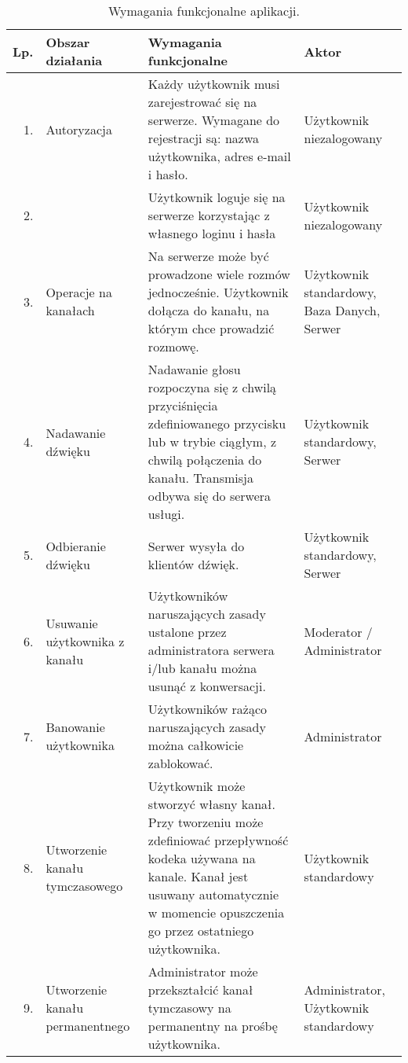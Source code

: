 \begin{longtabu} to 
	\caption{Wymagania funkcjonalne aplikacji.}
	\label{tab:wymfun} \\
	
	\hline
	\rowfont\bfseries Lp. & Obszar działania & Wymagania funkcjonalne & Aktor \\ \hline
	\endhead
	\endfoot
	\endlastfoot

	1.&
	Autoryzacja &
	Każdy użytkownik musi zarejestrować się na serwerze. Wymagane do
	rejestracji są: nazwa użytkownika, adres e-mail i hasło. &
	Użytkownik niezalogowany \\  
	
	2.&
	&
	Użytkownik loguje się na serwerze korzystając z własnego loginu i hasła &
	Użytkownik niezalogowany\\ \hline
	
	3.&
	Operacje na kanałach &
	Na serwerze może być prowadzone wiele rozmów jednocześnie. Użytkownik
	dołącza do kanału, na którym chce prowadzić rozmowę. &
	Użytkownik standardowy, Baza Danych, Serwer\\ \hline
	
	4.&
	Nadawanie dźwięku &
	Nadawanie głosu rozpoczyna się z chwilą przyciśnięcia zdefiniowanego
	przycisku lub w trybie ciągłym, z chwilą połączenia do kanału. Transmisja
	odbywa się do serwera usługi. &
	Użytkownik standardowy, Serwer\\ \hline
	
	5.&
	Odbieranie dźwięku & Serwer wysyła do klientów dźwięk. &
	Użytkownik standardowy, Serwer\\ \hline
	
	6.&
	Usuwanie użytkownika z kanału & Użytkowników naruszających zasady ustalone
	przez administratora serwera i/lub kanału można usunąć z konwersacji. &
	Moderator / Administrator\\ \hline
	
	7.&
	Banowanie użytkownika &
	Użytkowników rażąco naruszających zasady można całkowicie zablokować. &
	Administrator\\ \hline
	
	8.&
	Utworzenie kanału tymczasowego &
	Użytkownik może stworzyć własny kanał. Przy tworzeniu może zdefiniować
	przepływność kodeka używana na kanale. Kanał jest usuwany automatycznie w
	momencie opuszczenia go przez ostatniego użytkownika. &
	Użytkownik standardowy\\ \hline
	
	9.&
	Utworzenie kanału permanentnego &
	Administrator może przekształcić kanał tymczasowy na permanentny na prośbę
	użytkownika. &
	Administrator, Użytkownik standardowy \\ \hline
\end{longtabu}
